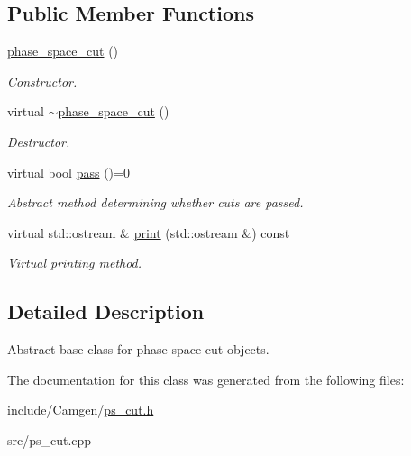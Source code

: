 \subsection*{Public Member Functions}
\begin{DoxyCompactItemize}
\item 
\hypertarget{a00419_a7b742727aae108cf4bb8db10603dbcbf}{}\hyperlink{a00419_a7b742727aae108cf4bb8db10603dbcbf}{phase\+\_\+space\+\_\+cut} ()\label{a00419_a7b742727aae108cf4bb8db10603dbcbf}

\begin{DoxyCompactList}\small\item\em Constructor. \end{DoxyCompactList}\item 
\hypertarget{a00419_aab826cb9424718c144c713f9e44a036f}{}virtual \hyperlink{a00419_aab826cb9424718c144c713f9e44a036f}{$\sim$phase\+\_\+space\+\_\+cut} ()\label{a00419_aab826cb9424718c144c713f9e44a036f}

\begin{DoxyCompactList}\small\item\em Destructor. \end{DoxyCompactList}\item 
\hypertarget{a00419_aa156dd35d45942961416a5fbe95a8ae0}{}virtual bool \hyperlink{a00419_aa156dd35d45942961416a5fbe95a8ae0}{pass} ()=0\label{a00419_aa156dd35d45942961416a5fbe95a8ae0}

\begin{DoxyCompactList}\small\item\em Abstract method determining whether cuts are passed. \end{DoxyCompactList}\item 
\hypertarget{a00419_a526f3e8c8f5a637d5bc2d143ce867e6a}{}virtual std\+::ostream \& \hyperlink{a00419_a526f3e8c8f5a637d5bc2d143ce867e6a}{print} (std\+::ostream \&) const \label{a00419_a526f3e8c8f5a637d5bc2d143ce867e6a}

\begin{DoxyCompactList}\small\item\em Virtual printing method. \end{DoxyCompactList}\end{DoxyCompactItemize}


\subsection{Detailed Description}
Abstract base class for phase space cut objects. 

The documentation for this class was generated from the following files\+:\begin{DoxyCompactItemize}
\item 
include/\+Camgen/\hyperlink{a00741}{ps\+\_\+cut.\+h}\item 
src/ps\+\_\+cut.\+cpp\end{DoxyCompactItemize}
